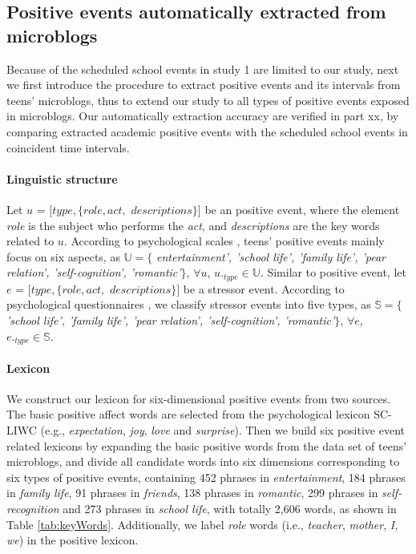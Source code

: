 \subsection{Positive events automatically extracted from microblogs}
Because of the scheduled school events in study 1 are limited to our study,
next we first introduce the procedure to extract positive events and its intervals from teens' microblogs,
thus to extend our study to all types of positive events exposed in microblogs.
Our automatically extraction accuracy are verified in part xx, by comparing extracted academic positive events with the scheduled school events in coincident time intervals.

\paragraph{Linguistic structure}
Let $u$ = $[type,\{role, act,$ $descriptions\}]$ be an positive event,
where the element \emph{role} is the subject who performs the \emph{act},
and \emph{descriptions} are the key words related to $u$.
According to psychological scales \cite{hassles,Jun2008Influence},
teens' positive events mainly focus on six aspects,
as $\mathbb{U} =\{$ \emph{entertainment', 'school life', 'family life',
'pear relation', 'self-cognition', 'romantic'}$\}$, $\forall u$, $u._{type} \in \mathbb{U}$.
Similar to positive event,
let $e$ = $[type,\{role, act,$ $descriptions\}]$ be a stressor event.
According to psychological questionnaires \cite{scale2, scale3, Kanner1981Comparison, scale1},
we classify stressor events into five types, as $\mathbb{S}=\{$ \emph{'school life', 'family life',
'pear relation', 'self-cognition', 'romantic'}$\}$, $\forall e$, $e._{type} \in \mathbb{S}$.

\paragraph{Lexicon}
We construct our lexicon for six-dimensional positive events from two sources.
The basic positive affect words are selected from the psychological lexicon SC-LIWC (e.g., \emph{expectation}, \emph{joy}, \emph{love} and \emph{surprise})\cite{Tausczik2010The}.
Then we build six positive event related lexicons by expanding the basic positive words from the data set of teens' microblogs,
and divide all candidate words into six dimensions corresponding to six types of positive events,
containing 452 phrases in \emph{entertainment},
184 phrases in \emph{family life},
91 phrases in \emph{friends},
138 phrases in \emph{romantic},
299 phrases in \emph{self-recognition} and 273 phrases in \emph{school life}, with totally 2,606 words,
as shown in Table \ref{tab:keyWords}.
Additionally, we label \emph{role} words (i.e., \emph{teacher}, \emph{mother}, \emph{I, we}) in the positive lexicon.

